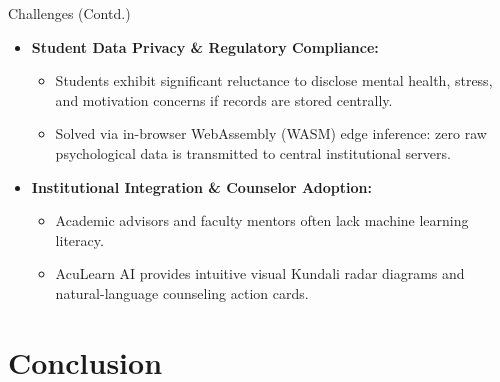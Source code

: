 \documentclass{beamer}
\begin{document}
\begin{frame}{Challenges (Contd.)}
  \begin{itemize}\setlength{\itemsep}{9pt}
    \item \textbf{Student Data Privacy \& Regulatory Compliance:}
    \begin{itemize}\setlength{\itemsep}{4pt}
      \item Students exhibit significant reluctance to disclose mental health, stress, and motivation concerns if records are stored centrally.
      \item Solved via in-browser WebAssembly (WASM) edge inference: zero raw psychological data is transmitted to central institutional servers.
    \end{itemize}
    
    \item \textbf{Institutional Integration \& Counselor Adoption:}
    \begin{itemize}\setlength{\itemsep}{4pt}
      \item Academic advisors and faculty mentors often lack machine learning literacy.
      \item AcuLearn AI provides intuitive visual Kundali radar diagrams and natural-language counseling action cards.
    \end{itemize}
  \end{itemize}
\end{frame}

\section{Conclusion}
\end{document}
